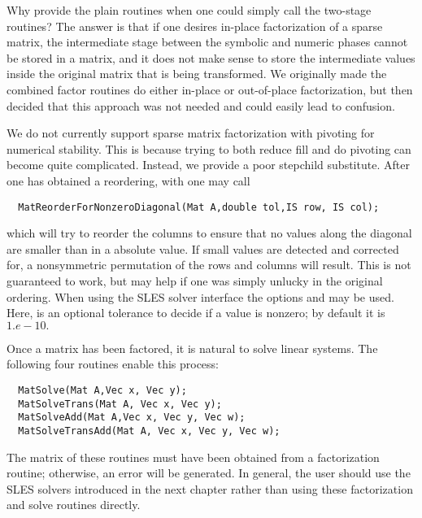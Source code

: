 Why provide the plain  routines when one could simply 
call the two-stage routines? The answer is that if one desires in-place 
factorization of a sparse matrix, the intermediate stage between the 
symbolic and numeric phases cannot be stored in a  matrix, and
it does not make sense to store the intermediate values
inside the original matrix 
that is being transformed.  We originally made the combined factor routines
do either in-place or out-of-place factorization, but then decided that 
this approach was not needed and could easily lead to confusion.

We do not currently support sparse matrix factorization with pivoting
for numerical stability. This is because trying to both reduce fill
and do pivoting can become quite complicated. Instead, we provide a 
poor stepchild substitute. After one has obtained a reordering, with
 one
may call
\begin{verbatim}
  MatReorderForNonzeroDiagonal(Mat A,double tol,IS row, IS col);
\end{verbatim}
which will try to reorder the columns to ensure that no values along 
the diagonal are smaller than  in a absolute value. If small 
values are detected and corrected for, a nonsymmetric
permutation of the rows and columns will result. This is not guaranteed to work, 
but may help if one was simply unlucky in the original ordering.
 When using the SLES solver interface
the options  
and 
 may be used.  Here, 
is an optional tolerance to decide if a value is nonzero; by default it
is $ 1.e-10.$ 

Once a matrix has been factored, it is natural to solve linear systems.
The following four routines enable this process:  
\begin{verbatim}
  MatSolve(Mat A,Vec x, Vec y);
  MatSolveTrans(Mat A, Vec x, Vec y);
  MatSolveAdd(Mat A,Vec x, Vec y, Vec w);
  MatSolveTransAdd(Mat A, Vec x, Vec y, Vec w);
\end{verbatim}
The  
matrix 
 of these routines must have been obtained from a 
factorization routine; otherwise, an error will be generated.
In general, the user should use the SLES solvers introduced in the 
next chapter rather than using these factorization and solve routines
directly.

